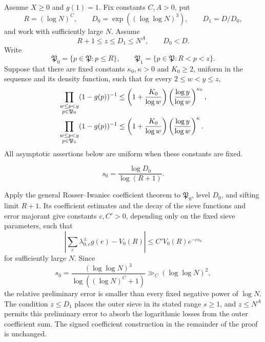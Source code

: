 
Assume \(X\geq0\) and \(g(1)=1\).
Fix constants \(C,A>0\), put
\[
 R=(\log N)^C,\qquad
 D_0=\exp((\log\log N)^3),\qquad D_1=D/D_0,
\]
and work with sufficiently large \(N\). Assume
\[
 R+1\leq z\leq D_1\leq N^A,\qquad D_0<D.
\]
Write
\[
 \mathfrak P_0=\{p\in\mathfrak P:p\leq R\},\qquad
 \mathfrak P_1=\{p\in\mathfrak P:R<p<z\}.
\]
Suppose that there are fixed constants
\(\kappa_0,\kappa>0\) and \(K_0\geq2\), uniform in the sequence and
its density function, such that for every \(2\leq w<y\leq z\),
\begin{align}\label{e:tworangesievedimension}
 \prod_{\substack{w\leq p<y\\p\in\mathfrak P_0}}
 (1-g(p))^{-1}
 &\leq
 \left(1+\frac{K_0}{\log w}\right)
 \left(\frac{\log y}{\log w}\right)^{\kappa_0},\notag\\
 \prod_{\substack{w\leq p<y\\p\in\mathfrak P_1}}
 (1-g(p))^{-1}
 &\leq
 \left(1+\frac{K_0}{\log w}\right)
 \left(\frac{\log y}{\log w}\right)^\kappa.
\end{align}
All asymptotic assertions below are uniform when these constants are fixed.


\[
 s_0=\frac{\log D_0}{\log(R+1)}.
\]


Apply the general Rosser--Iwaniec coefficient theorem to
\(\mathfrak P_0\), level \(D_0\), and sifting limit \(R+1\).
Its coefficient estimates and the decay of the sieve functions and error
majorant give constants \(c,C'>0\), depending only on the fixed sieve
parameters, such that
\[
 \left|\sum_e\lambda_{0,e}^{\pm}g(e)-V_0(R)\right|
 \leq C'V_0(R)e^{-c s_0}
\]
for sufficiently large \(N\). Since
\[
 s_0=\frac{(\log\log N)^3}{\log((\log N)^C+1)}
 \gg_C(\log\log N)^2,
\]
the relative preliminary error is smaller than every fixed negative
power of \(\log N\). The condition \(z\leq D_1\) places the outer
sieve in its stated range \(s\geq1\), and \(z\leq N^A\) permits this
preliminary error to absorb the logarithmic losses from the outer
coefficient sum. The signed coefficient construction in the remainder
of the proof is unchanged.

